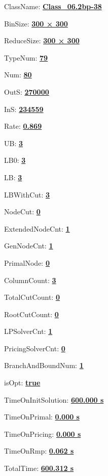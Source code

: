 \documentclass[11pt]{article}
\begin{document}
\pagestyle{empty}


ClassName: \underline{\textbf{Class_06.2bp-38}}
\par
BinSize: \underline{\textbf{300 × 300}}
\par
ReduceSize: \underline{\textbf{300 × 300}}
\par
TypeNum: \underline{\textbf{79}}
\par
Num: \underline{\textbf{80}}
\par
OutS: \underline{\textbf{270000}}
\par
InS: \underline{\textbf{234559}}
\par
Rate: \underline{\textbf{0.869}}
\par
UB: \underline{\textbf{3}}
\par
LB0: \underline{\textbf{3}}
\par
LB: \underline{\textbf{3}}
\par
LBWithCut: \underline{\textbf{3}}
\par
NodeCut: \underline{\textbf{0}}
\par
ExtendedNodeCnt: \underline{\textbf{1}}
\par
GenNodeCnt: \underline{\textbf{1}}
\par
PrimalNode: \underline{\textbf{0}}
\par
ColumnCount: \underline{\textbf{3}}
\par
TotalCutCount: \underline{\textbf{0}}
\par
RootCutCount: \underline{\textbf{0}}
\par
LPSolverCnt: \underline{\textbf{1}}
\par
PricingSolverCnt: \underline{\textbf{0}}
\par
BranchAndBoundNum: \underline{\textbf{1}}
\par
isOpt: \underline{\textbf{true}}
\par
TimeOnInitSolution: \underline{\textbf{600.000 s}}
\par
TimeOnPrimal: \underline{\textbf{0.000 s}}
\par
TimeOnPricing: \underline{\textbf{0.000 s}}
\par
TimeOnRmp: \underline{\textbf{0.062 s}}
\par
TotalTime: \underline{\textbf{600.312 s}}
\par
\newpage
\end{document}
